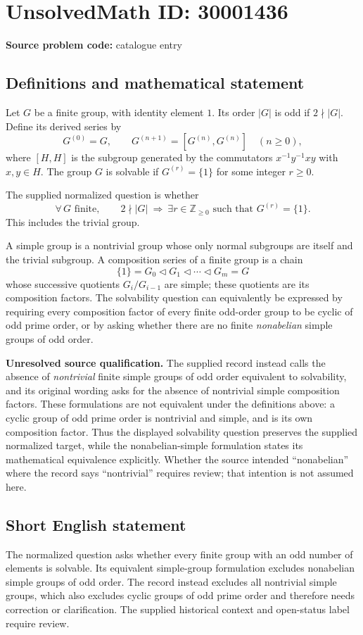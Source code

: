 \documentclass[11pt]{article}
\newcommand{\Z}{\mathbb{Z}}
\begin{document}
\section*{UnsolvedMath ID: 30001436}
\textbf{Source problem code:} catalogue entry
\subsection{Definitions and mathematical statement}
Let \(G\) be a finite group, with identity element \(1\). Its order \(|G|\) is odd if \(2\nmid |G|\). Define its derived series by
\[
G^{(0)}=G,\qquad G^{(n+1)}=[G^{(n)},G^{(n)}]\quad(n\geq 0),
\]
where \([H,H]\) is the subgroup generated by the commutators \(x^{-1}y^{-1}xy\) with \(x,y\in H\). The group \(G\) is solvable if \(G^{(r)}=\{1\}\) for some integer \(r\geq 0\).

The supplied normalized question is whether
\[
\forall\,G\text{ finite},\qquad 2\nmid |G|\ \Longrightarrow\ \exists r\in\Z_{\geq 0}\text{ such that }G^{(r)}=\{1\}.
\]
This includes the trivial group.

A simple group is a nontrivial group whose only normal subgroups are itself and the trivial subgroup. A composition series of a finite group is a chain
\[
\{1\}=G_0\triangleleft G_1\triangleleft\cdots\triangleleft G_m=G
\]
whose successive quotients \(G_i/G_{i-1}\) are simple; these quotients are its composition factors. The solvability question can equivalently be expressed by requiring every composition factor of every finite odd-order group to be cyclic of odd prime order, or by asking whether there are no finite \emph{nonabelian} simple groups of odd order.

\textbf{Unresolved source qualification.} The supplied record instead calls the absence of \emph{nontrivial} finite simple groups of odd order equivalent to solvability, and its original wording asks for the absence of nontrivial simple composition factors. These formulations are not equivalent under the definitions above: a cyclic group of odd prime order is nontrivial and simple, and is its own composition factor. Thus the displayed solvability question preserves the supplied normalized target, while the nonabelian-simple formulation states its mathematical equivalence explicitly. Whether the source intended ``nonabelian'' where the record says ``nontrivial'' requires review; that intention is not assumed here.
\subsection{Short English statement}
The normalized question asks whether every finite group with an odd number of elements is solvable. Its equivalent simple-group formulation excludes nonabelian simple groups of odd order. The record instead excludes all nontrivial simple groups, which also excludes cyclic groups of odd prime order and therefore needs correction or clarification. The supplied historical context and open-status label require review.
\end{document}

